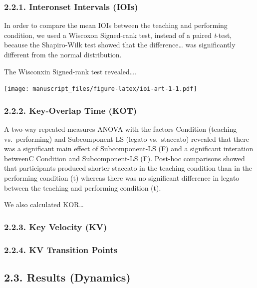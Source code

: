 \documentclass[
  english,
  man,floatsintext]{apa6}
\begin{document}
\hypertarget{interonset-intervals-iois}{%
\subsubsection{2.2.1. Interonset Intervals (IOIs)}\label{interonset-intervals-iois}}

In order to compare the mean IOIs between the teaching and performing condition, we used a Wiscoxon Signed-rank test, instead of a paired \emph{t}-test, because the Shapiro-Wilk test showed that the difference\ldots{} was significantly different from the normal distribution.

The Wisconxin Signed-rank test revealed\ldots.

\texttt{[image: manuscript\_files/figure-latex/ioi-art-1-1.pdf]}

\hypertarget{key-overlap-time-kot}{%
\subsubsection{2.2.2. Key-Overlap Time (KOT)}\label{key-overlap-time-kot}}

A two-way repeated-measures ANOVA with the factors Condition (teaching vs.~performing) and Subcomponent-LS (legato vs.~staccato) revealed that there was a significant main effect of Subcomponent-LS (F) and a significant interation betweenC Condition and Subcomponent-LS (F). Post-hoc comparisons showed that participants produced shorter staccato in the teaching condition than in the performing condition (t) whereas there was no significant difference in legato between the teaching and performing condition (t).

We also calculated KOR\ldots{}

\hypertarget{key-velocity-kv}{%
\subsubsection{2.2.3. Key Velocity (KV)}\label{key-velocity-kv}}

\hypertarget{kv-transition-points}{%
\subsubsection{2.2.4. KV Transition Points}\label{kv-transition-points}}

\hypertarget{results-dynamics}{%
\subsection{2.3. Results (Dynamics)}\label{results-dynamics}}
\end{document}
